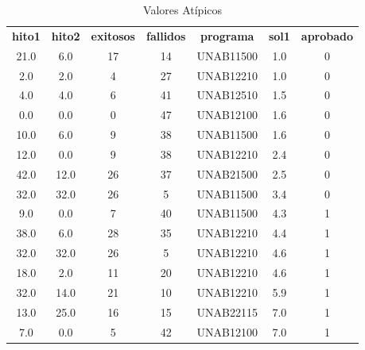 \begin{table}[H]
    \centering
    \caption{Valores Atípicos}
    \begin{tabular}{ccccccc}
        \hline
        \textbf{hito1} & \textbf{hito2} & \textbf{exitosos} & \textbf{fallidos} & \textbf{programa} & \textbf{sol1} & \textbf{aprobado}     \\
        21.0           & 6.0            & 17                & 14                                  & UNAB11500     & 1.0               & 0 \\
        2.0            & 2.0            & 4                 & 27                                  & UNAB12210     & 1.0               & 0 \\
        4.0            & 4.0            & 6                 & 41                                  & UNAB12510     & 1.5               & 0 \\
        0.0            & 0.0            & 0                 & 47                                  & UNAB12100     & 1.6               & 0 \\
        10.0           & 6.0            & 9                 & 38                                  & UNAB11500     & 1.6               & 0 \\
        12.0           & 0.0            & 9                 & 38                                  & UNAB12210     & 2.4               & 0 \\
        42.0           & 12.0           & 26                & 37                                  & UNAB21500     & 2.5               & 0 \\
        32.0           & 32.0           & 26                & 5                                   & UNAB11500     & 3.4               & 0 \\
        9.0            & 0.0            & 7                 & 40                                  & UNAB11500     & 4.3               & 1 \\
        38.0           & 6.0            & 28                & 35                                  & UNAB12210     & 4.4               & 1 \\
        32.0           & 32.0           & 26                & 5                                   & UNAB12210     & 4.6               & 1 \\
        18.0           & 2.0            & 11                & 20                                  & UNAB12210     & 4.6               & 1 \\
        32.0           & 14.0           & 21                & 10                                  & UNAB12210     & 5.9               & 1 \\
        13.0           & 25.0           & 16                & 15                                  & UNAB22115     & 7.0               & 1 \\
        7.0            & 0.0            & 5                 & 42                                  & UNAB12100     & 7.0               & 1 \\
        \hline
    \end{tabular}%
    \label{tab:valores_atipicos}%
\end{table}%

